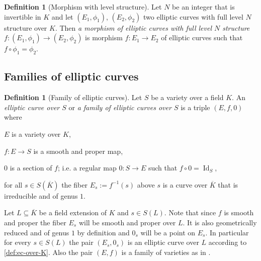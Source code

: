 \documentclass[a4paper,12pt,reqno]{amsart}
\DeclareMathOperator{\id}{Id}
\theoremstyle{definition}
\newtheorem{definition}[lemma]{Definition}
\numberwithin{lemma}{section}
\numberwithin{equation}{section}
\numberwithin{figure}{section}
\begin{document}
\begin{definition}[Morphism with level structure]
Let $N$ be an integer that is invertible in $K$ and let $(E_1,\phi_1)$, $(E_2,\phi_2)$ two elliptic curves with full level $N$ structure over $K$. Then \textit{a morphism of elliptic curves with full level $N$ structure}  $f: (E_1,\phi_1) \to (E_2,\phi_2)$ is morphism $f: E_1 \to E_2$ of elliptic curves such that $f \circ \phi_1 = \phi_2$.
\end{definition}



\subsection{Families of elliptic curves}

\begin{definition}[Family of elliptic curves]\label{def:ec-over-var}
Let $S$ be a variety over a field $K$. An \textit{elliptic curve over $S$} or \textit{a family of elliptic curves over $S$} is a triple $(E,f,0)$ where
\begin{defenum}
	\item $E$ is a variety over $K$,
	\item $f : E \to S$ is a smooth and proper map,
	\item $0$ is a section of $f$; i.e.  a regular map $0: S \to E$ such that $f \circ 0 = \id_S$,
	\item for all $s \in S(\overline K)$ the fiber $E_{s} := f^{-1}(s)$ above $s$ is a curve over $\overline K$ that is irreducible  and of genus $1$.
\end{defenum}
\end{definition}



Let $L \subseteq \overline K$ be a field extension of $K$ and $s \in S(L)$. Note that since $f$ is smooth and proper the fiber $E_s$ will be smooth and proper over $L$. It is also geometrically reduced and of genus $1$ by definition and $0_s$ will be a point on $E_s$. In particular for every  $s \in S(L)$ the pair $(E_s,0_s)$ is an elliptic curve over $L$ according to \cref{def:ec-over-K}. Also the pair $(E,f)$ is a family of varieties as in .
\end{document}

